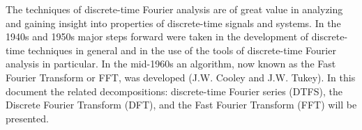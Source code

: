 \documentclass{article}
\begin{document}
\begin{CellGroup}


The techniques of discrete-time Fourier analysis are of great value in analyzing and gaining insight into properties of discrete-time signals and
systems.  In the 1940s and 1950s major steps forward were taken in the development of discrete-time techniques in general and in the use of the tools
of discrete-time Fourier analysis in particular.  In the mid-1960s an algorithm, now known as the Fast Fourier Transform or FFT, was developed (J.W.
Cooley and J.W. Tukey).  In this document the related decompositions: discrete-time Fourier series (DTFS), the Discrete Fourier Transform (DFT),
and the Fast Fourier Transform (FFT) will be presented.


\end{CellGroup}
\end{document}
